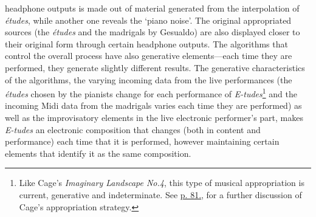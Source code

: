 headphone outputs is made out of material generated from the interpolation of \emph{\'{e}tudes}, while another one reveals the `piano noise'. The original appropriated sources (the \emph{\'{e}tudes} and the madrigals by Gesualdo) are also displayed closer to their original form through certain headphone outputs. The algorithms that control the overall process have also generative elements---each time they are performed, they generate slightly different results. The generative characteristics of the algorithms, the varying incoming data from the live performances (the \emph{\'{e}tudes} chosen by the pianists change for each performance of \emph{E-tudes}\footnote{Like Cage's \emph{Imaginary Landscape No.4}, this type of musical appropriation is current, generative and indeterminate. See \hyperlink{landscape4}{p. 81.}, for a further discussion of Cage's appropriation strategy.} and the incoming Midi data from the madrigals varies each time they are performed) as well as the improvisatory elements in the live electronic performer's part, makes \emph{E-tudes} an electronic composition that changes (both in content and performance) each time that it is performed, however maintaining certain elements that identify it as the same composition.

